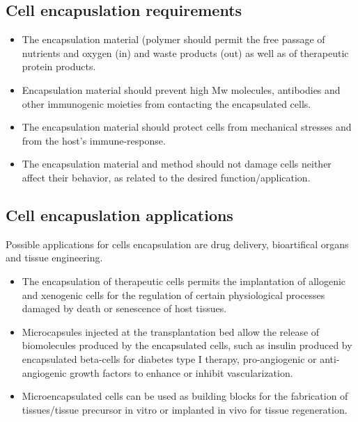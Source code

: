     \subsection{Cell encapuslation requirements}
    
    \begin{multicols}{2}
        \begin{itemize}
            \item The encapsulation material (polymer should permit the free passage of nutrients and oxygen (in) and waste products (out) as well as of therapeutic protein products.
            \item Encapsulation material should prevent high Mw molecules, antibodies and other immunogenic moieties from contacting the encapsulated cells. 
            \item The encapsulation material should protect cells from mechanical stresses and from the host's immune-response.
            \item The encapsulation material and method should not damage cells neither affect their behavior, as related to the desired function/application.
        \end{itemize}
    \end{multicols}
    
    \subsection{Cell encapuslation applications}
    Possible applications for cells encapsulation are drug delivery, bioartifical organs and tissue engineering. 
    
    \begin{multicols}{2}
        \begin{itemize}
            \item The encapsulation of therapeutic cells permits the implantation of allogenic and xenogenic cells for the regulation of certain physiological processes damaged by death or senescence of host tissues. 
            \item Microcapsules injected at the transplantation bed allow the release of biomolecules produced by the encapsulated cells, such as insulin produced by encapsulated beta-cells for diabetes type I therapy, pro-angiogenic or anti-angiogenic growth factors to enhance or inhibit vascularization.
            \item Microencapsulated cells can be used as building blocks for the fabrication of tissues/tissue precursor in vitro or implanted in vivo for tissue regeneration.
        \end{itemize}   
    \end{multicols}

